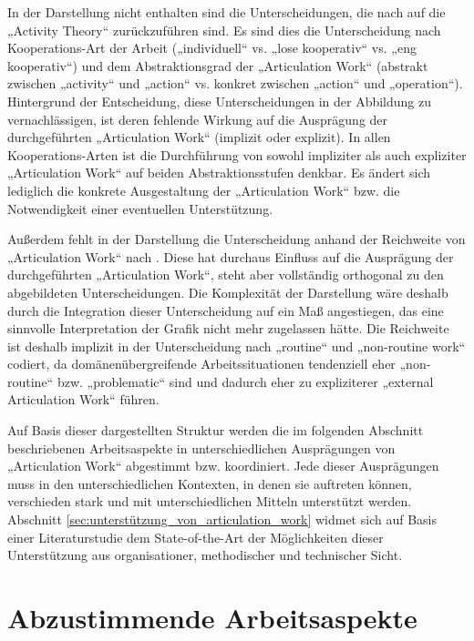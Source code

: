 In der Darstellung nicht enthalten sind die Unterscheidungen, die nach \citep{Fjuk97} auf die „Activity Theory“ zurückzuführen sind. Es sind dies die Unterscheidung nach Kooperations-Art der Arbeit („individuell“ vs. „lose kooperativ“ vs. „eng kooperativ“) und dem Abstraktionsgrad der „Articulation Work“ (abstrakt zwischen „activity“ und „action“ vs. konkret zwischen „action“ und „operation“). Hintergrund der Entscheidung, diese Unterscheidungen in der Abbildung zu vernachlässigen, ist deren fehlende Wirkung auf die Ausprägung der durchgeführten „Articulation Work“ (implizit oder explizit). In allen Kooperations-Arten ist die Durchführung von sowohl impliziter als auch expliziter „Articulation Work“ auf beiden Abstraktionsstufen denkbar. Es ändert sich lediglich die konkrete Ausgestaltung der „Articulation Work“ bzw. die Notwendigkeit einer eventuellen Unterstützung.

Außerdem fehlt in der Darstellung die Unterscheidung anhand der Reichweite von „Articulation Work“ nach \citep{Faergemann05}. Diese hat durchaus Einfluss auf die Ausprägung der durchgeführten „Articulation Work“, steht aber vollständig orthogonal zu den abgebildeten Unterscheidungen. Die Komplexität der Darstellung wäre deshalb durch die Integration dieser Unterscheidung auf ein Maß angestiegen, das eine sinnvolle Interpretation der Grafik nicht mehr zugelassen hätte. Die Reichweite ist deshalb implizit in der Unterscheidung nach „routine“ und „non-routine work“ codiert, da domänenübergreifende Arbeitssituationen tendenziell eher „non-routine“ bzw. „problematic“ sind und dadurch eher zu expliziterer „external Articulation Work“ führen.

Auf Basis dieser dargestellten Struktur werden die im folgenden Abschnitt beschriebenen Arbeitsaspekte in unterschiedlichen Ausprägungen von „Articulation Work“ abgestimmt bzw. koordiniert. Jede dieser Ausprägungen muss in den unterschiedlichen Kontexten, in denen sie auftreten können, verschieden stark und mit unterschiedlichen Mitteln unterstützt werden. Abschnitt \ref{sec:unterstützung_von_articulation_work} widmet sich auf Basis einer Literaturstudie dem State-of-the-Art der Möglichkeiten dieser Unterstützung aus organisationer, methodischer und technischer Sicht.


\section{Abzustimmende Arbeitsaspekte} %
\label{sec:abzustimmende_arbeitsaspekte}

